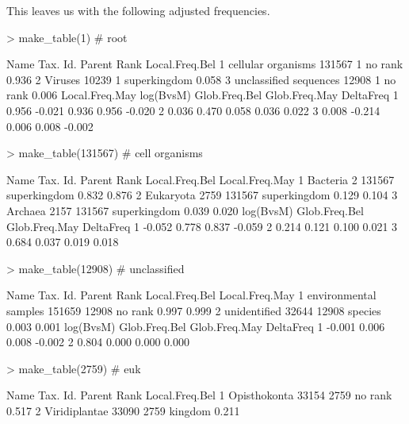 \documentclass{article}
\begin{document}
This leaves us with the following adjusted frequencies.
\begin{Schunk}
\begin{Sinput}
> make_table(1) # root
\end{Sinput}
\begin{Soutput}
                    Name Tax. Id. Parent         Rank Local.Freq.Bel
1     cellular organisms   131567      1      no rank          0.936
2                Viruses    10239      1 superkingdom          0.058
3 unclassified sequences    12908      1      no rank          0.006
  Local.Freq.May log(BvsM) Glob.Freq.Bel Glob.Freq.May DeltaFreq
1          0.956    -0.021         0.936         0.956    -0.020
2          0.036     0.470         0.058         0.036     0.022
3          0.008    -0.214         0.006         0.008    -0.002
\end{Soutput}
\begin{Sinput}
> make_table(131567) # cell organisms
\end{Sinput}
\begin{Soutput}
       Name Tax. Id. Parent         Rank Local.Freq.Bel Local.Freq.May
1  Bacteria        2 131567 superkingdom          0.832          0.876
2 Eukaryota     2759 131567 superkingdom          0.129          0.104
3   Archaea     2157 131567 superkingdom          0.039          0.020
  log(BvsM) Glob.Freq.Bel Glob.Freq.May DeltaFreq
1    -0.052         0.778         0.837    -0.059
2     0.214         0.121         0.100     0.021
3     0.684         0.037         0.019     0.018
\end{Soutput}
\begin{Sinput}
> make_table(12908) # unclassified
\end{Sinput}
\begin{Soutput}
                   Name Tax. Id. Parent    Rank Local.Freq.Bel Local.Freq.May
1 environmental samples   151659  12908 no rank          0.997          0.999
2          unidentified    32644  12908 species          0.003          0.001
  log(BvsM) Glob.Freq.Bel Glob.Freq.May DeltaFreq
1    -0.001         0.006         0.008    -0.002
2     0.804         0.000         0.000     0.000
\end{Soutput}
\begin{Sinput}
> make_table(2759) # euk
\end{Sinput}
\begin{Soutput}
                      Name Tax. Id. Parent    Rank Local.Freq.Bel
1             Opisthokonta    33154   2759 no rank          0.517
2            Viridiplantae    33090   2759 kingdom          0.211

\end{Soutput}
\end{Schunk}
\end{document}
